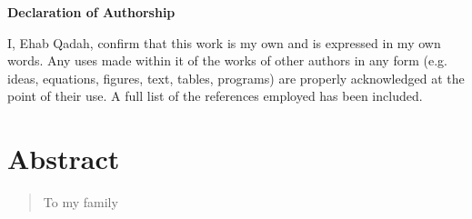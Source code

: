\documentclass[12pt, %
a4paper, %
twoside, %
openright, %
abstract=on, %
DIV=11,      %
BCOR=8mm,openright]{scrbook}
\begin{document}
	\frontmatter
	
	

	\vspace{4cm}
	
	
	\thispagestyle{empty}
	{\noindent%
		\huge{\textbf{\textsf{Declaration of Authorship}}}
	}
	\vspace{2cm}
	\begin{flushleft}
		\noindent%
		I, Ehab Qadah, confirm that this work is my own and is expressed in my own words. Any
		uses made within it of the works of other authors in any form (e.g. ideas, equations, figures,
		text, tables, programs) are properly acknowledged at the point of their use. A full list of the
		references employed has been included.
	\end{flushleft}
	
	

	\chapter*{Abstract}
	\thispagestyle{empty}
    
    
    
	\newpage    
	\vspace*{\fill} 
	\begin{quote} 
		\centering 
		To my family 
	\end{quote}
	\vspace*{\fill}
	\tableofcontents
	\thispagestyle{empty}
	\listoffigures
	
	\mainmatter
	
	
	
	
	
	
	
	

	
	
	
	
	\FloatBarrier
	

	
	 
\end{document}
